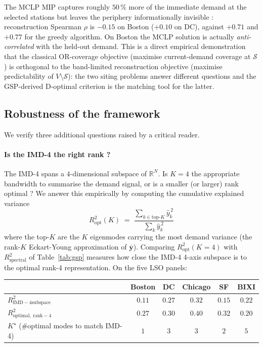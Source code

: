 The MCLP MIP captures roughly $50\,\%$ more of the immediate
demand at the selected stations but leaves the periphery
informationally invisible : reconstruction Spearman $\rho$ is
$-0.15$ on Boston ($+0.10$ on DC), against $+0.71$ and $+0.77$
for the greedy algorithm.  On Boston the MCLP solution is
actually \emph{anti-correlated} with the held-out demand.  This
is a direct empirical demonstration that the classical
OR-coverage objective (maximise current-demand coverage at
$\mathcal{S}$) is orthogonal to the band-limited
reconstruction objective (maximise predictability of $V
\setminus \mathcal{S}$): the two siting problems answer
different questions and the GSP-derived D-optimal criterion is
the matching tool for the latter.

\subsection{Robustness of the framework}
\label{sec:gsp-robustness}

We verify three additional questions raised by a critical reader.

\paragraph{Is the IMD-4 the right rank ?}
The IMD-4 spans a $4$-dimensional subspace of $\mathbb{R}^N$.  Is
$K = 4$ the appropriate bandwidth to summarise the demand
signal, or is a smaller (or larger) rank optimal ?  We answer
this empirically by computing the cumulative explained variance
\begin{equation}
    R^2_{\mathrm{opt}}(K) \;=\; \frac{\sum_{k \in \mathrm{top\text{-}}K} \hat{y}_k^{\,2}}{\sum_k \hat{y}_k^{\,2}}
    \label{eq:r2-opt-K}
\end{equation}
where the top-$K$ are the $K$ eigenmodes carrying the most
demand variance (the rank-$K$ Eckart-Young approximation of
$\bar{\mathbf{y}}$).  Comparing $R^2_{\mathrm{opt}}(K = 4)$ with
$R^2_{\mathrm{spectral}}$ of Table~\ref{tab:gsp} measures how
close the IMD-4 4-axis subspace is to the optimal rank-4
representation.  On the five LSO panels:

\begin{center}
\small
\begin{tabular}{@{}lccccc@{}}
\toprule
                       & Boston & DC & Chicago & SF & BIXI \\
\midrule
$R^2_{\mathrm{IMD-4 subspace}}$    & $0.11$ & $0.27$ & $0.32$ & $0.15$ & $\mathbf{0.22}$ \\
$R^2_{\mathrm{optimal,\ rank-4}}$   & $0.27$ & $0.30$ & $0.40$ & $0.32$ & $0.20$ \\
$K^{\star}$ (\#optimal modes to match IMD-4) & $1$ & $3$ & $3$ & $2$ & $5$ \\
\bottomrule
\end{tabular}
\end{center}

